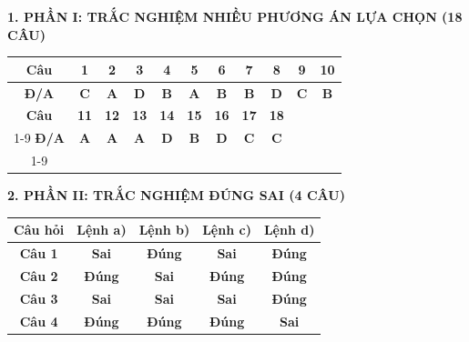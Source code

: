 \documentclass[11pt,a4paper]{article}
\begin{document}
\vspace{2pt}
\noindent
\textbf{\color{mainGreen}1. PHẦN I: TRẮC NGHIỆM NHIỀU PHƯƠNG ÁN LỰA CHỌN (18 CÂU)}
\begin{center}
\renewcommand{\arraystretch}{1.2}
\begin{tabular}{|c|c|c|c|c|c|c|c|c|c|c|}
\hline
\rowcolor{tableGreen}
\textbf{Câu} & \textbf{1} & \textbf{2} & \textbf{3} & \textbf{4} & \textbf{5} & \textbf{6} & \textbf{7} & \textbf{8} & \textbf{9} & \textbf{10} \\
\hline
\textbf{Đ/A} & \textbf{\color{hfRed}C} & \textbf{\color{hfRed}A} & \textbf{\color{hfRed}D} & \textbf{\color{hfRed}B} & \textbf{\color{hfRed}A} & \textbf{\color{hfRed}B} & \textbf{\color{hfRed}B} & \textbf{\color{hfRed}D} & \textbf{\color{hfRed}C} & \textbf{\color{hfRed}B} \\
\hline
\rowcolor{tableGreen}
\textbf{Câu} & \textbf{11} & \textbf{12} & \textbf{13} & \textbf{14} & \textbf{15} & \textbf{16} & \textbf{17} & \textbf{18} & \multicolumn{2}{c|}{} \\
\cline{1-9}
\textbf{Đ/A} & \textbf{\color{hfRed}A} & \textbf{\color{hfRed}A} & \textbf{\color{hfRed}A} & \textbf{\color{hfRed}D} & \textbf{\color{hfRed}B} & \textbf{\color{hfRed}D} & \textbf{\color{hfRed}C} & \textbf{\color{hfRed}C} & \multicolumn{2}{c|}{} \\
\cline{1-9}
\end{tabular}
\end{center}

\vspace{2pt}
\noindent
\textbf{\color{mainGreen}2. PHẦN II: TRẮC NGHIỆM ĐÚNG SAI (4 CÂU)}
\begin{center}
\renewcommand{\arraystretch}{1.2}
\begin{tabular}{|c|c|c|c|c|}
\hline
\rowcolor{tableGreen}
\textbf{Câu hỏi} & \textbf{Lệnh a)} & \textbf{Lệnh b)} & \textbf{Lệnh c)} & \textbf{Lệnh d)} \\
\hline
\textbf{Câu 1} & \textbf{Sai} & \textbf{\color{hfRed}Đúng} & \textbf{Sai} & \textbf{\color{hfRed}Đúng} \\
\hline
\textbf{Câu 2} & \textbf{\color{hfRed}Đúng} & \textbf{Sai} & \textbf{\color{hfRed}Đúng} & \textbf{\color{hfRed}Đúng} \\
\hline
\textbf{Câu 3} & \textbf{Sai} & \textbf{Sai} & \textbf{Sai} & \textbf{\color{hfRed}Đúng} \\
\hline
\textbf{Câu 4} & \textbf{\color{hfRed}Đúng} & \textbf{\color{hfRed}Đúng} & \textbf{\color{hfRed}Đúng} & \textbf{Sai} \\
\hline
\end{tabular}
\end{center}
\end{document}
